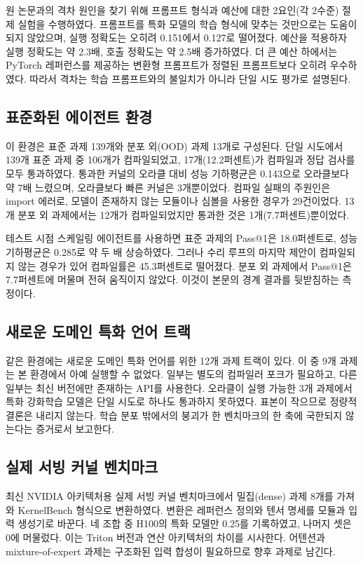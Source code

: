 원 논문과의 격차 원인을 찾기 위해 프롬프트 형식과 예산에 대한 2요인(각 2수준) 절제 실험을 수행하였다.
프롬프트를 특화 모델의 학습 형식에 맞추는 것만으로는 도움이 되지 않았으며, 실행 정확도는 오히려
0.151에서 0.127로 떨어졌다. 예산을 적용하자 실행 정확도는 약 2.3배, 호출 정확도는 약 2.5배
증가하였다. 더 큰 예산 하에서는 PyTorch 레퍼런스를 제공하는 변환형 프롬프트가 정렬된 프롬프트보다
오히려 우수하였다. 따라서 격차는 학습 프롬프트와의 불일치가 아니라 단일 시도 평가로 설명된다.

\subsection{표준화된 에이전트 환경}
이 환경은 표준 과제 139개와 분포 외(OOD) 과제 13개로 구성된다. 단일 시도에서 139개 표준 과제 중
106개가 컴파일되었고, 17개(12.2퍼센트)가 컴파일과 정답 검사를 모두 통과하였다. 통과한 커널의
오라클 대비 성능 기하평균은 0.143으로 오라클보다 약 7배 느렸으며, 오라클보다 빠른 커널은 3개뿐이었다.
컴파일 실패의 주원인은 import 에러로, 모델이 존재하지 않는 모듈이나 심볼을 사용한 경우가 29건이었다.
13개 분포 외 과제에서는 12개가 컴파일되었지만 통과한 것은 1개(7.7퍼센트)뿐이었다.

테스트 시점 스케일링 에이전트를 사용하면 표준 과제의 Pass@1은 18.0퍼센트로, 성능 기하평균은
0.285로 약 두 배 상승하였다. 그러나 수리 루프의 마지막 제안이 컴파일되지 않는 경우가 있어 컴파일률은
45.3퍼센트로 떨어졌다. 분포 외 과제에서 Pass@1은 7.7퍼센트에 머물며 전혀 움직이지 않았다. 이것이
본문의 경계 결과를 뒷받침하는 측정이다.

\subsection{새로운 도메인 특화 언어 트랙}
같은 환경에는 새로운 도메인 특화 언어를 위한 12개 과제 트랙이 있다. 이 중 9개 과제는 본 환경에서
아예 실행할 수 없었다. 일부는 별도의 컴파일러 포크가 필요하고, 다른 일부는 최신 버전에만 존재하는
API를 사용한다. 오라클이 실행 가능한 3개 과제에서 특화 강화학습 모델은 단일 시도로 하나도 통과하지
못하였다. 표본이 작으므로 정량적 결론은 내리지 않는다. 학습 분포 밖에서의 붕괴가 한 벤치마크의
한 축에 국한되지 않는다는 증거로서 보고한다.

\subsection{실제 서빙 커널 벤치마크}
최신 NVIDIA 아키텍처용 실제 서빙 커널 벤치마크에서 밀집(dense) 과제 8개를 가져와 KernelBench
형식으로 변환하였다. 변환은 레퍼런스 정의와 텐서 명세를 모듈과 입력 생성기로 바꾼다. 네 조합 중
H100의 특화 모델만 0.25를 기록하였고, 나머지 셋은 0에 머물렀다. 이는 Triton 버전과 연산
아키텍처의 차이를 시사한다. 어텐션과 mixture-of-expert 과제는 구조화된 입력 합성이 필요하므로
향후 과제로 남긴다.

